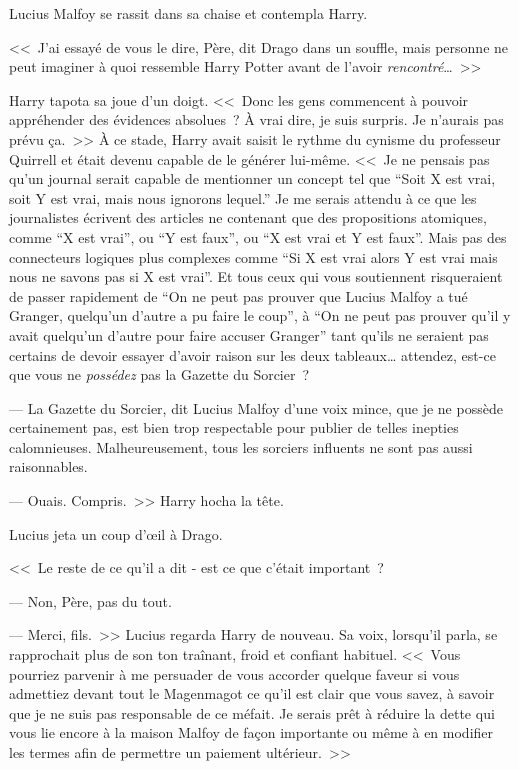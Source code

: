 Lucius Malfoy se rassit dans sa chaise et contempla Harry.

<<~J'ai essayé de vous le dire, Père, dit Drago dans un souffle, mais personne ne peut imaginer à quoi ressemble Harry Potter avant de l'avoir \emph{rencontré}…~>>

Harry tapota sa joue d'un doigt. <<~Donc les gens commencent à pouvoir appréhender des évidences absolues~? À vrai dire, je suis surpris. Je n'aurais pas prévu ça.~>> À ce stade, Harry avait saisit le rythme du cynisme du professeur Quirrell et était devenu capable de le générer lui-même. <<~Je ne pensais pas qu'un journal serait capable de mentionner un concept tel que “Soit X est vrai, soit Y est vrai, mais nous ignorons lequel.” Je me serais attendu à ce que les journalistes écrivent des articles ne contenant que des propositions atomiques, comme “X est vrai”, ou “Y est faux”, ou “X est vrai et Y est faux”. Mais pas des connecteurs logiques plus complexes comme “Si X est vrai alors Y est vrai mais nous ne savons pas si X est vrai”. Et tous ceux qui vous soutiennent risqueraient de passer rapidement de “On ne peut pas prouver que Lucius Malfoy a tué Granger, quelqu'un d'autre a pu faire le coup”, à “On ne peut pas prouver qu'il y avait quelqu'un d'autre pour faire accuser Granger” tant qu'ils ne seraient pas certains de devoir essayer d'avoir raison sur les deux tableaux… attendez, est-ce que vous ne \emph{possédez} pas la Gazette du Sorcier~?

--- La Gazette du Sorcier, dit Lucius Malfoy d'une voix mince, que je ne possède certainement pas, est bien trop respectable pour publier de telles inepties calomnieuses. Malheureusement, tous les sorciers influents ne sont pas aussi raisonnables.

--- Ouais. Compris.~>> Harry hocha la tête.

Lucius jeta un coup d'œil à Drago.

<<~Le reste de ce qu'il a dit - est ce que c'était important~?

--- Non, Père, pas du tout.

--- Merci, fils.~>> Lucius regarda Harry de nouveau. Sa voix, lorsqu'il parla, se rapprochait plus de son ton traînant, froid et confiant habituel. <<~Vous pourriez parvenir à me persuader de vous accorder quelque faveur si vous admettiez devant tout le Magenmagot ce qu'il est clair que vous savez, à savoir que je ne suis pas responsable de ce méfait. Je serais prêt à réduire la dette qui vous lie encore à la maison Malfoy de façon importante ou même à en modifier les termes afin de permettre un paiement ultérieur.~>>

